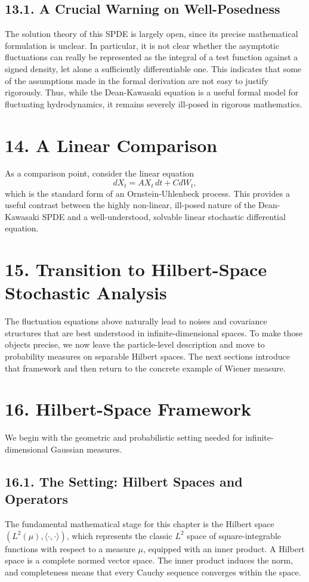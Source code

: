 \documentclass[11pt]{article}
\theoremstyle{definition}
\theoremstyle{remark}
\begin{document}
\subsection*{13.1. A Crucial Warning on Well-Posedness}
The solution theory of this SPDE is largely open, since its precise mathematical formulation is unclear. In particular, it is not clear whether the asymptotic fluctuations can really be represented as the integral of a test function against a signed density, let alone a sufficiently differentiable one. This indicates that some of the assumptions made in the formal derivation are not easy to justify rigorously. Thus, while the Dean-Kawasaki equation is a useful formal model for fluctuating hydrodynamics, it remains severely ill-posed in rigorous mathematics.

\section*{14. A Linear Comparison}
As a comparison point, consider the linear equation
\[
dX_t=AX_t\,dt+CdW_t,
\]
which is the standard form of an Ornstein-Uhlenbeck process. This provides a useful contrast between the highly non-linear, ill-posed nature of the Dean-Kawasaki SPDE and a well-understood, solvable linear stochastic differential equation.

\section*{15. Transition to Hilbert-Space Stochastic Analysis}
The fluctuation equations above naturally lead to noises and covariance structures that are best understood in infinite-dimensional spaces. To make those objects precise, we now leave the particle-level description and move to probability measures on separable Hilbert spaces. The next sections introduce that framework and then return to the concrete example of Wiener measure.

\section*{16. Hilbert-Space Framework}
We begin with the geometric and probabilistic setting needed for infinite-dimensional Gaussian measures.

\subsection*{16.1. The Setting: Hilbert Spaces and Operators}
The fundamental mathematical stage for this chapter is the Hilbert space $(L^2(\mu),\langle\cdot,\cdot\rangle)$, which represents the classic $L^2$ space of square-integrable functions with respect to a measure $\mu$, equipped with an inner product. A Hilbert space is a complete normed vector space. The inner product induces the norm, and completeness means that every Cauchy sequence converges within the space.
\end{document}
